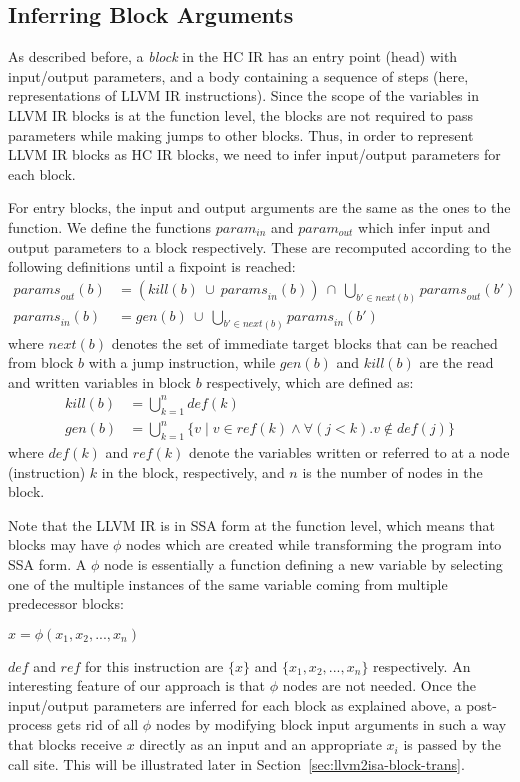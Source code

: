 \documentclass{llncs}
\newcommand{\hcir}{HC IR\xspace}
\newcommand{\llvmir}{LLVM IR\xspace}
\begin{document}
\subsection{Inferring Block Arguments} 
As described before, a \textit{block} in the \hcir has an entry point
(head) with input/output parameters, and a body containing a sequence
of steps
(here, representations of \llvmir instructions). 
Since the scope of the variables in \llvmir blocks is at the function
level, the blocks are not required to pass parameters while making
jumps to other blocks. Thus, in order to represent \llvmir blocks as
\hcir blocks, we need to infer input/output parameters for each block.

For entry blocks, the input and output arguments are the same as the ones to the function.
We define the functions
$param_{in}$ and $param_{out}$ which infer input and output parameters
to a block respectively. 
These are recomputed according to the following definitions until a
fixpoint is reached:
\begin{align*}
\mathit{params}_{out}(b) & = \textstyle (kill(b) \ \cup\ \mathit{params}_{in}(b))
      \ \cap\ \bigcup_{b'\in \mathit{next}(b)}\mathit{params}_{out}(b') \\
\mathit{params}_{in}(b) & = \textstyle gen(b)\ \cup\ \bigcup_{b'\in \mathit{next}(b)} \mathit{params}_{in}(b')
\end{align*}
where $\mathit{next}(b)$ denotes the set of immediate target blocks
that can be reached from block $b$ with a jump instruction, while $gen(b)$
and $kill(b)$ are the read and written variables in block $b$
respectively, which are defined as:
\begin{align*}
kill(b)&=\textstyle\bigcup\limits_{k=1}^{n}\mathit{def}(k) \\
gen(b)&=\textstyle\bigcup\limits_{k=1}^{n}\{v\mid v\in \mathit{ref}(k) \wedge \forall (j<k). v\notin \mathit{def}(j)\}
\end{align*}
where $\mathit{def}(k)$ and $\mathit{ref}(k)$ denote the variables
written or referred to at a node (instruction) $k$ in the block,
respectively, and $n$ is the number of nodes in the block.

Note that the \llvmir is in SSA form at the function level, which
means that blocks may have $\phi$ nodes which are created while
transforming the program into SSA form. A $\phi$ node is essentially a
function defining a new variable by selecting one of the multiple
instances of the same variable coming from multiple predecessor
blocks:
\begin{center}
$x=\phi(x_1, x_2, ..., x_n)$
\end{center}
$\mathit{def}$ and $\mathit{ref}$ for this instruction are $\{x\}$ and $\{x_1, x_2, ... ,
x_n\}$ respectively. 
An interesting feature of our approach is that $\phi$ nodes are not
needed. Once the input/output parameters are inferred for each block
as explained above, a post-process gets rid of all $\phi$ nodes by
modifying block input arguments in such a way that blocks receive $x$
directly as an input and an appropriate $x_i$ is passed by the call
site. This will be illustrated later in
Section~\ref{sec:llvm2isa-block-trans}.
\end{document}
